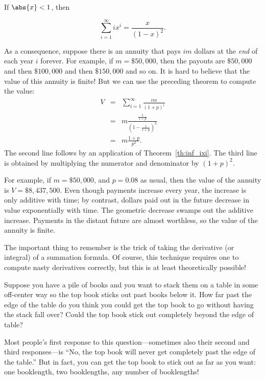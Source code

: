 \begin{theorem}
\label{th:inf_ixi}
If $\abs{x} < 1$, then

\[
\sum_{i=1}^\infty i x^i = \frac{x}{(1-x)^2}.
\]
\end{theorem}

As a consequence, suppose there is an annuity that pays $im$ dollars
at the {\em end} of each year $i$ forever.  For example, if $m =
\$50,000$, then the payouts are $\$50,000$ and then $\$100,000$ and
then $\$150,000$ and so on.  It is hard to believe that the value of
this annuity is finite!  But we can use the preceding theorem to
compute the value:
\begin{eqnarray*}
V & = & \sum_{i=1}^\infty \frac{im}{(1+p)^i} \\
  & = & m \frac{\frac{1}{1+p}}{(1 - \frac{1}{1+p})^2} \\
  & = & m \frac{1+p}{p^2}.
\end{eqnarray*}
The second line follows by an application of Theorem~\ref{th:inf_ixi}.
The third line is obtained by multiplying the numerator and
denominator by $(1+p)^2$.

For example, if $m = \$50,000$, and $p = 0.08$ as usual, then the
value of the annuity is $V = \$8,437,500$.  Even though payments
increase every year, the increase is only additive with time; by
contrast, dollars paid out in the future decrease in value
exponentially with time.  The geometric decrease swamps out the
additive increase.  Payments in the distant future are almost
worthless, so the value of the annuity is finite.

The important thing to remember is the trick of taking the derivative
(or integral) of a summation formula.  Of course, this technique
requires one to compute nasty derivatives correctly, but this is at
least theoretically possible!
\fi

\label{book_stacking_sec}

Suppose you have a pile of books and you want to stack them on a table in
some off-center way so the top book sticks out past books below it.  How
far past the edge of the table do you think you could get the top book to
go without having the stack fall over?  Could the top book stick out
completely beyond the edge of table?

Most people's first response to this question---sometimes also their
second and third responses---is ``No, the top book will never get
completely past the edge of the table.''  But in fact, you can get the top
book to stick out as far as you want: one booklength, two booklengths, any
number of booklengths!


